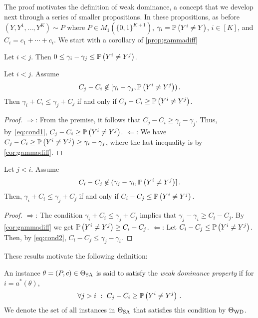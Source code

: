 The proof motivates the definition of weak dominance, a concept that we develop next through a series of smaller
propositions. In these propositions, as before $(Y,Y^1,\dots,Y^K) \sim P$ where $P\in M_1(\{0,1\}^{K+1})$,
 $\gamma_i = \mathbb{P}\left(Y^i \ne Y\right)$, $i\in [K]$, and $C_i = c_1 + \cdots + c_i$.
We start with a corollary of \cref{prop:gammadiff}
\begin{cor}
\label{cor:gammadiff}
Let $i<j$. Then $0\le \gamma_i -\gamma_j \le \mathbb{P}\left(Y^i\ne Y^j\right)$.
\end{cor}
\begin{prop}
\label{prop:ilej}
Let $i<j$. Assume 
\begin{align}
\label{eq:cond1}
C_j - C_i \not\in [\gamma_i - \gamma_j, \mathbb{P}\left(Y^i\ne Y^j\right) )\,.
\end{align}
Then $\gamma_i + C_i \le \gamma_j + C_j$ if and only if $C_j - C_i \ge \mathbb{P}\left(Y^i\ne Y^j\right)$.
\end{prop}
\begin{proof}
\noindent $\Rightarrow$: From the premise, it follows that $C_j - C_i \ge \gamma_i - \gamma_j$.
Thus, by~\eqref{eq:cond1}, $C_j - C_i \ge \mathbb{P}\left(Y^i\ne Y^j\right)$.
\noindent $\Leftarrow$: We have $C_j - C_i \ge \mathbb{P}\left(Y^i \ne Y^j\right) \ge \gamma_i -\gamma_j$, where the last
inequality is by \cref{cor:gammadiff}.
\end{proof}
\begin{prop}
\label{prop:jlei}
Let $j<i$. Assume
\begin{align}
\label{eq:cond2}
C_i - C_j \not\in (\gamma_j - \gamma_i, \mathbb{P}\left(Y^i \ne Y^j\right) ]\,.
\end{align}
Then, $\gamma_i + C_i \le \gamma_j + C_j$ if and only if $C_i - C_j \le \mathbb{P}\left(Y^i \ne Y^j\right)$.
\end{prop}
\begin{proof}
\noindent $\Rightarrow$: The condition $\gamma_i + C_i \le \gamma_j + C_j$ implies that $\gamma_j -\gamma_i \ge C_i - C_j$.
By \cref{cor:gammadiff} we get $\mathbb{P}\left(Y^i \ne Y^j\right) \ge C_i - C_j$.
\noindent $\Leftarrow$: Let $C_i - C_j \le \mathbb{P}\left(Y^i \ne Y^j\right)$. Then, by \eqref{eq:cond2}, $C_i - C_j \le \gamma_j - \gamma_i$.
\end{proof}
These results motivate the following definition:
\begin{defi}
	An instance $\theta = (P,c)\in \Theta_{\mathrm{SA}}$  is said to satisfy the \emph{weak dominance property} if 
	for $i = a^*(\theta)$,
	\begin{align}
	\label{eq:wd} \forall j>i\,\,: \,\, C_j - C_i \ge \mathbb{P}\left(Y^i\ne Y^j\right)\,.
	\end{align}
We denote the set of all instances in $\Theta_{\mathrm{SA}}$ that satisfies this condition by $\Theta_{\mathrm{WD}}$.	
\end{defi}
